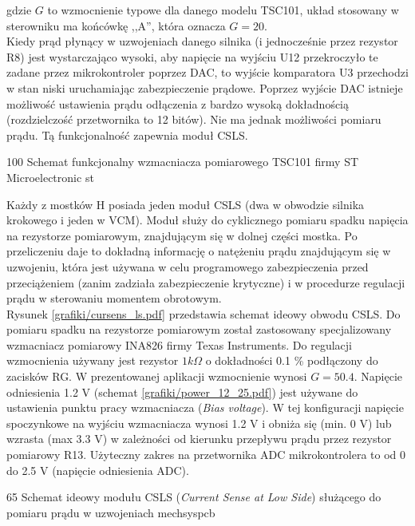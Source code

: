 gdzie $ G $ to wzmocnienie typowe dla danego modelu TSC101, układ stosowany w sterowniku ma końcówkę ,,A'', która oznacza $ G = 20 $. \\

Kiedy prąd płynący w uzwojeniach danego silnika (i jednocześnie przez rezystor R8) jest wystarczająco wysoki, aby napięcie na wyjściu U12 przekroczyło te zadane przez mikrokontroler poprzez DAC, to wyjście komparatora U3 przechodzi w stan niski uruchamiając zabezpieczenie prądowe. Poprzez wyjście DAC istnieje możliwość ustawienia prądu odłączenia z bardzo wysoką dokładnością (rozdzielczość przetwornika to 12 bitów). Nie ma jednak możliwości pomiaru prądu. Tą funkcjonalność zapewnia moduł CSLS.

	{100}
	{Schemat funkcjonalny wzmacniacza pomiarowego TSC101 firmy ST Microelectronic}
	{st}


Każdy z mostków H posiada jeden moduł CSLS (dwa w obwodzie silnika krokowego i jeden w VCM). Moduł służy do cyklicznego pomiaru spadku napięcia na rezystorze pomiarowym, znajdującym się w dolnej części mostka. Po przeliczeniu daje to dokładną informację o natężeniu prądu znajdującym się w uzwojeniu, która jest używana w celu programowego zabezpieczenia przed przeciążeniem (zanim zadziała zabezpieczenie krytyczne) i w procedurze regulacji prądu w sterowaniu momentem obrotowym. \\

Rysunek \ref{grafiki/cursens_ls.pdf} przedstawia schemat ideowy obwodu CSLS. Do pomiaru spadku na rezystorze pomiarowym został zastosowany specjalizowany wzmacniacz pomiarowy INA826 firmy Texas Instruments. Do regulacji wzmocnienia używany jest rezystor $ 1 k\Omega $ o dokładności 0.1 \% podłączony do zacisków RG. W prezentowanej aplikacji wzmocnienie wynosi $ G = 50.4 $. Napięcie odniesienia 1.2 V (schemat \ref{grafiki/power_12_25.pdf}) jest używane do ustawienia punktu pracy wzmacniacza ({\it Bias voltage}). W tej konfiguracji napięcie spoczynkowe na wyjściu wzmacniacza wynosi 1.2 V i obniża się (min. 0 V) lub wzrasta (max 3.3 V) w zależności od kierunku przepływu prądu przez rezystor pomiarowy R13. Użyteczny zakres na przetwornika ADC mikrokontrolera to od 0 do 2.5 V (napięcie odniesienia ADC).

	{65}
	{Schemat ideowy modułu CSLS ({\it Current Sense at Low Side}) służącego do pomiaru prądu w uzwojeniach}
	{mechsyspcb}
	
